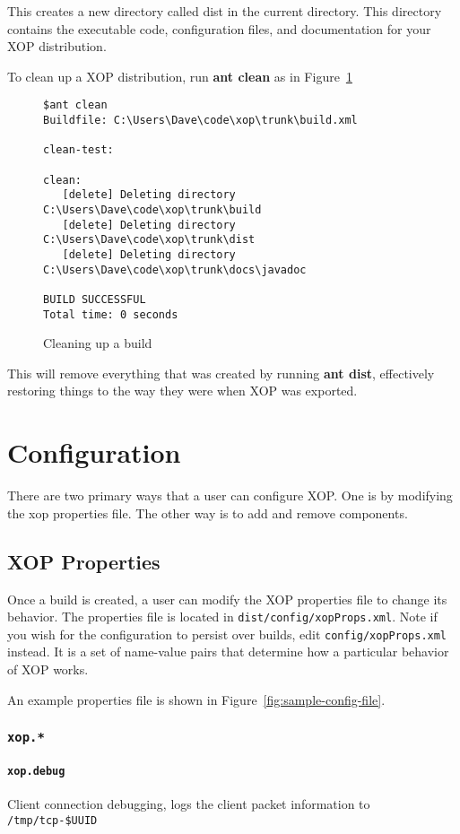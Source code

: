 \documentclass[draft]{article}
\begin{document}
This creates a new directory called dist in the current directory.
This directory contains the executable code, configuration files,
and documentation for your XOP distribution.

To clean up a XOP distribution, run \textbf{ant clean} as in Figure~\ref{fig:ant-clean}

\begin{figure}
\begin{verbatim}
$ant clean
Buildfile: C:\Users\Dave\code\xop\trunk\build.xml

clean-test:

clean:
   [delete] Deleting directory C:\Users\Dave\code\xop\trunk\build
   [delete] Deleting directory C:\Users\Dave\code\xop\trunk\dist
   [delete] Deleting directory C:\Users\Dave\code\xop\trunk\docs\javadoc

BUILD SUCCESSFUL
Total time: 0 seconds
\end{verbatim}
\caption{Cleaning up a build}
\label{fig:ant-clean}
\end{figure}

This will remove everything that was created by running \textbf{ant dist},
effectively restoring things to the way they were when XOP was exported.

\FloatBarrier
\section{Configuration}
There are two primary ways that a user can configure XOP.  One is by modifying
the xop properties file.  The other way is to add and remove components.

\subsection{XOP Properties}
Once a build is created, a user can modify the XOP properties file to change its
behavior.  The properties file is located in \texttt{dist/config/xopProps.xml}. 
Note if you wish for the configuration to persist over builds, edit \texttt{config/xopProps.xml} instead.
It is a set of name-value pairs that determine how a particular behavior of XOP
works.

An example properties file is shown in Figure~\ref{fig:sample-config-file}.
\subsubsection{\texttt{xop.*}}
\paragraph{\texttt{xop.debug}}
Client connection debugging, logs the client packet information to \texttt{/tmp/tcp-\$UUID}
\end{document}
